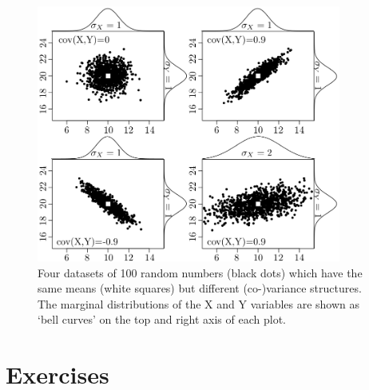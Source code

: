 \documentclass{book}
\newif\ifpdf
\begin{document}
\begin{figure}[!ht]
  \centering
  \ifpdf
  \def\svgwidth{\textwidth}
  
  \else
  \includegraphics[width=10cm]{covariance.png}
  \fi
  \caption{Four datasets of 100 random numbers (black dots) which have
    the same means (white squares) but different (co-)variance
    structures. The marginal distributions of the X and Y variables
    are shown as `bell curves' on the top and right axis of each
    plot.}
  \label{fig:covariance}
\end{figure}

\chapter{Exercises}
\label{sec:exercises}
\end{document}
